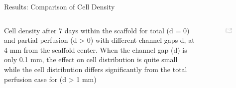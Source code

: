 \documentclass[11pt,t]{beamer}
\begin{document}
\begin{frame}[fragile]{Results: Comparison of Cell Density}  

	\begin{columns}[t]
		\begin{column}{.5\textwidth}
Cell density after 7 days within the scaffold for total (d = 0)
and partial perfusion (d > 0) with different channel gaps d, at 4 mm from
the scaffold center. When the channel gap (d) is only 0.1 mm, the effect on
cell distribution is quite small while the cell distribution differs significantly
from the total perfusion case for (d > 1 mm)
	
 
		\end{column}
		\begin{column}{.5\textwidth}
			\begin{figure}
			\centering
			\includegraphics[width=0.7\textwidth]{math_comp1}
			
			\end{figure}
		\end{column}
	\end{columns}	
		
\end{frame}
\end{document}
